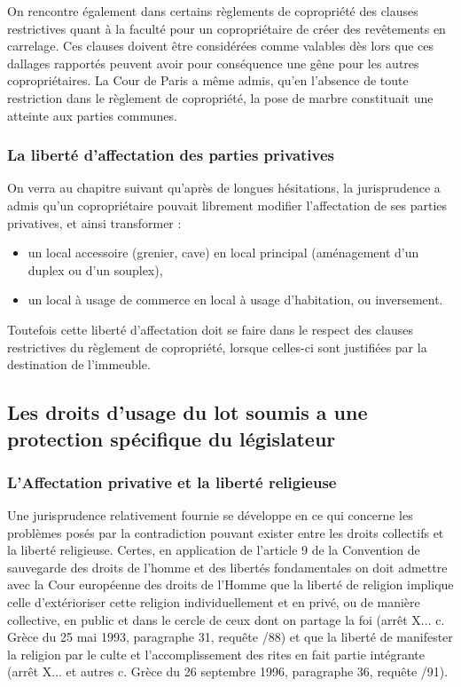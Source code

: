 			On rencontre également dans certains règlements de copropriété des clauses restrictives quant à la faculté pour un copropriétaire de créer des revêtements en carrelage. Ces clauses doivent être considérées comme valables dès lors que ces dallages rapportés peuvent avoir pour conséquence une gêne pour les autres copropriétaires. La Cour de Paris a même admis, qu’en l’absence de toute restriction dans le règlement de copropriété, la pose de marbre constituait une atteinte aux parties communes.
		
		\subsubsection{La liberté d’affectation des parties privatives}
		
			On verra au chapitre suivant qu’après de longues hésitations, la jurisprudence a admis qu’un copropriétaire pouvait librement modifier l’affectation de ses parties privatives, et ainsi transformer :
			\begin{itemize}
				\item un local accessoire (grenier, cave) en local principal (aménagement d’un duplex ou d’un souplex),
				\item un local à usage de commerce en local à usage d’habitation, ou inversement.
			\end{itemize}
			
			Toutefois cette liberté d’affectation doit se faire dans le respect des clauses restrictives du règlement de copropriété, lorsque celles-ci sont justifiées par la destination de l’immeuble.
		
	\subsection{Les droits d’usage du lot soumis a une protection spécifique du législateur}
		
		\subsubsection{L’Affectation privative et la liberté religieuse}
		
			Une jurisprudence relativement fournie se développe en ce qui concerne les problèmes posés par la contradiction pouvant exister entre les droits collectifs et la liberté religieuse.
			Certes, en application de l'article 9 de la Convention de sauvegarde des droits de l'homme et des libertés fondamentales on doit admettre avec la Cour européenne des droits de l’Homme que la liberté de religion implique celle d'extérioriser cette religion individuellement et en privé, ou de manière collective, en public et dans le cercle de ceux dont on partage la foi (arrêt X... c. Grèce du 25 mai 1993, paragraphe 31, requête /88) et que la liberté de manifester la religion par le culte et l'accomplissement des rites en fait partie intégrante (arrêt X... et autres c. Grèce du 26 septembre 1996, paragraphe 36, requête /91).
			

